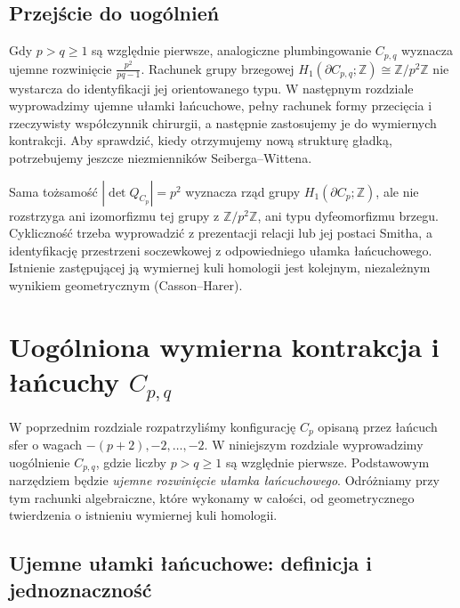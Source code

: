 \section{Przejście do uogólnień}
\label{sec:tg-rb-general}
Gdy $p>q\geq1$ są względnie pierwsze, analogiczne
plumbingowanie $C_{p,q}$ wyznacza ujemne rozwinięcie
$\frac{p^2}{pq-1}$. Rachunek grupy brzegowej
$H_1(\partial C_{p,q};\mathbb Z)\cong\mathbb Z/p^2\mathbb Z$
nie wystarcza do identyfikacji jej orientowanego typu.
W następnym rozdziale wyprowadzimy ujemne ułamki łańcuchowe,
pełny rachunek formy przecięcia i rzeczywisty współczynnik
chirurgii, a następnie zastosujemy je do wymiernych kontrakcji.
Aby sprawdzić, kiedy otrzymujemy nową strukturę gładką,
potrzebujemy jeszcze niezmienników Seiberga--Wittena.

\begin{uwaga}
Sama tożsamość $|\det Q_{C_p}|=p^2$ wyznacza rząd
grupy $H_1(\partial C_p;\mathbb Z)$, ale nie rozstrzyga
ani izomorfizmu tej grupy z $\mathbb Z/p^2\mathbb Z$,
ani typu dyfeomorfizmu brzegu. Cykliczność trzeba
wyprowadzić z prezentacji relacji lub jej postaci Smitha,
a identyfikację przestrzeni soczewkowej z odpowiedniego
ułamka łańcuchowego. Istnienie zastępującej ją wymiernej
kuli homologii jest kolejnym, niezależnym wynikiem
geometrycznym (Casson--Harer).
\end{uwaga}

\chapter{Uogólniona wymierna kontrakcja i łańcuchy \texorpdfstring{$C_{p,q}$}{Cpq}}
\label{ch:tg-rb-general}

W poprzednim rozdziale rozpatrzyliśmy konfigurację $C_p$ opisaną przez
łańcuch sfer o wagach $-(p+2),-2,\ldots,-2$. W niniejszym
rozdziale wyprowadzimy uogólnienie $C_{p,q}$, gdzie liczby $p>q\geq1$
są względnie pierwsze. Podstawowym narzędziem będzie \emph{ujemne
rozwinięcie ułamka łańcuchowego}. Odróżniamy przy tym rachunki
algebraiczne, które wykonamy w całości, od geometrycznego twierdzenia
o istnieniu wymiernej kuli homologii.

\section{Ujemne ułamki łańcuchowe: definicja i jednoznaczność}
\label{sec:tg-general-cf}


